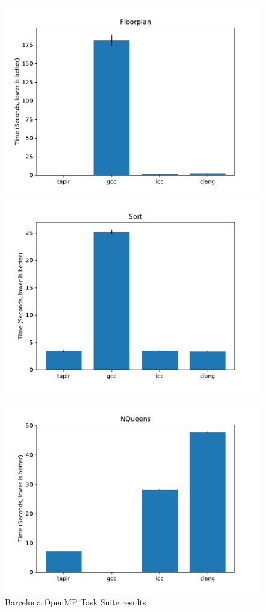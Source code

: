 \documentclass[sigconf]{acmart}
\begin{document}
\begin{figure}
\begin{multicols}{2}
  \includegraphics[width=\linewidth]{floorplan.pdf}
  \includegraphics[width=\linewidth]{sort.pdf} \par
  \includegraphics[width=\linewidth]{nqueens.pdf}
\end{multicols}
\caption{Barcelona OpenMP Task Suite results}
\label{fig:results}
\end{figure}
\end{document}
